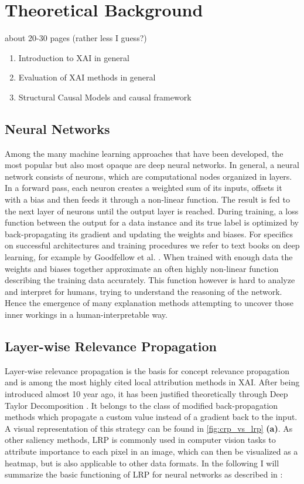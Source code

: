 \chapter{Theoretical Background}\label{chapter:background}

{ \color{red}

    about 20-30 pages (rather less I guess?)

    \begin{enumerate}
        \item Introduction to XAI in general
        \item Evaluation of XAI methods in general
        \item Structural Causal Models and causal framework
    \end{enumerate}
}

\section{Neural Networks}
Among the many machine learning approaches that have been developed, the most popular but also most opaque are deep neural networks. In general, a neural network consists of neurons, which are computational nodes organized in layers. In a forward pass, each neuron creates a weighted sum of its inputs, offsets it with a bias and then feeds it through a non-linear function. The result is fed to the next layer of neurons until the output layer is reached. During training, a loss function between the output for a data instance and its true label is optimized by back-propagating its gradient and updating the weights and biases. For specifics on successful architectures and training procedures we refer to text books on deep learning, for example by Goodfellow et al. \cite{Goodfellow2016}. When trained with enough data the weights and biases together approximate an often highly non-linear function describing the training data accurately. This function however is hard to analyze and interpret for humans, trying to understand the reasoning of the network. Hence the emergence of many explanation methods attempting to uncover those inner workings in a human-interpretable way.

\section{Layer-wise Relevance Propagation}
Layer-wise relevance propagation \cite{Bach2015} is the basis for concept relevance propagation and is among the most highly cited local attribution methods in XAI. After being introduced almost 10 year ago, it has been justified theoretically through Deep Taylor Decomposition \cite{Montavon2017}. It belongs to the class of modified back-propagation methods which propagate a custom value instead of a gradient back to the input. A visual representation of this strategy can be found in \cref{fig:crp_vs_lrp} \textbf{(a)}. As other saliency methods, LRP is commonly used in computer vision tasks to attribute importance to each pixel in an image, which can then be visualized as a heatmap, but is also applicable to other data formats. In the following I will summarize the basic functioning of LRP for neural networks as described in \cite{Bach2015}:

